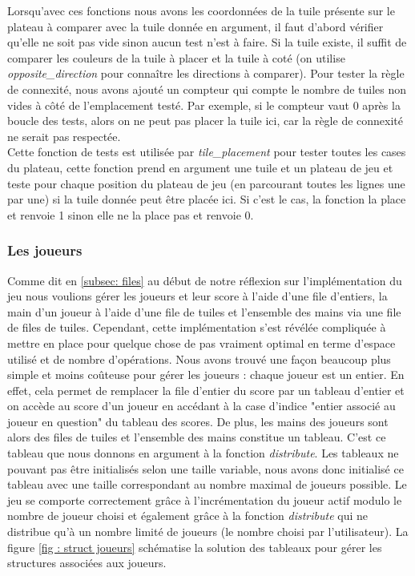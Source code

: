 \documentclass[11pt]{article}
\begin{document}
Lorsqu'avec ces fonctions nous avons les coordonnées de la tuile présente sur le plateau à comparer avec la tuile donnée en argument, il faut d'abord vérifier qu'elle ne soit pas vide sinon aucun test n'est à faire. Si la tuile existe, il suffit de comparer les couleurs de la tuile à placer et la tuile à coté (on utilise \emph{opposite\_direction} pour connaître les directions à comparer). Pour tester la règle de connexité, nous avons ajouté un compteur qui compte le nombre de tuiles non vides à côté de l'emplacement testé. Par exemple, si le compteur vaut 0 après la boucle des tests, alors on ne peut pas placer la tuile ici, car la règle de connexité ne serait pas respectée. \\

Cette fonction de tests est utilisée par \emph{tile\_placement} pour tester toutes les cases du plateau, cette fonction prend en argument une tuile et un plateau de jeu et teste pour chaque position du plateau de jeu (en parcourant toutes les lignes une par une) si la tuile donnée peut être placée ici. Si c'est le cas, la fonction la place et renvoie 1 sinon elle ne la place pas et renvoie 0.

\subsubsection{Les joueurs}\label{subsec: player}
Comme dit en \ref{subsec: files} au début de notre réflexion sur l'implémentation du jeu nous voulions gérer les joueurs et leur score à l'aide d'une file d'entiers, la main d'un joueur à l'aide d'une file de tuiles et l'ensemble des mains via une file de files de tuiles. Cependant, cette implémentation s'est révélée compliquée à mettre en place pour quelque chose de pas vraiment optimal en terme d'espace utilisé et de nombre d'opérations. Nous avons trouvé une façon beaucoup plus simple et moins coûteuse pour gérer les joueurs : chaque joueur est un entier. En effet, cela permet de remplacer la file d'entier du score par un tableau d'entier et on accède au score d'un joueur en accédant à la case d'indice "entier associé au joueur en question" du tableau des scores. De plus, les mains des joueurs sont alors des files de tuiles et l'ensemble des mains constitue un tableau. C'est ce tableau que nous donnons en argument à la fonction \emph{distribute}. Les tableaux ne pouvant pas être initialisés selon une taille variable, nous avons donc initialisé ce tableau avec une taille correspondant au nombre maximal de joueurs possible. Le jeu se comporte correctement grâce à l'incrémentation du joueur actif modulo le nombre de joueur choisi et également grâce à la fonction \emph{distribute} qui ne distribue qu'à un nombre limité de joueurs (le nombre choisi par l'utilisateur). La figure \ref{fig : struct joueurs} schématise la solution des tableaux pour gérer les structures associées aux joueurs. 
\\
\end{document}
